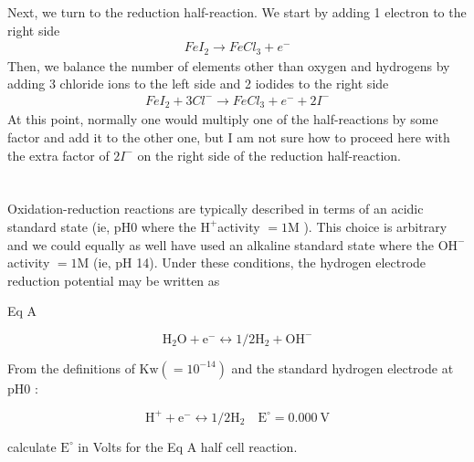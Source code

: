 \documentclass[12pt]{article}
\begin{document}
Next, we turn to the reduction half-reaction. We start by adding 1 electron to the right side
\begin{equation}
\begin{aligned}
FeI_{2} \rightarrow FeCl_{3} + e^{-}
\end{aligned}
\end{equation}
Then, we balance the number of elements other than oxygen and hydrogens by adding 3 chloride ions to the left side and 2 iodides to the right side
\begin{equation}
\begin{aligned}
FeI_{2} + 3Cl^{-} \rightarrow FeCl_{3} + e^{-} + 2I^{-}
\end{aligned}
\end{equation}
At this point, normally one would multiply one of the half-reactions by some factor and add it to the other one, but I am not sure how to proceed here with the extra factor of $2I^{-}$ on the right side of the reduction half-reaction.




\section{}
Oxidation-reduction reactions are typically described in terms of an acidic standard state (ie, $\mathrm{pH} 0$ where the $\mathrm{H}^{+}$activity $=1 \mathrm{M}$ ). This choice is arbitrary and we could equally as well have used an alkaline standard state where the $\mathrm{OH}^{-}$activity $=1 \mathrm{M}$ (ie, $\mathrm{pH}$ 14). Under these conditions, the hydrogen electrode reduction potential may be written as

Eq A

$$
\mathrm{H}_{2} \mathrm{O}+\mathrm{e}^{-} \leftrightarrow 1 / 2 \mathrm{H}_{2}+\mathrm{OH}^{-}
$$

From the definitions of $\mathrm{Kw}\left(=10^{-14}\right)$ and the standard hydrogen electrode at $\mathrm{pH} 0$ :

$$
\mathrm{H}^{+}+\mathrm{e}^{-} \leftrightarrow 1 / 2 \mathrm{H}_{2} \quad \mathrm{E}^{\circ}=0.000 \mathrm{~V}
$$

calculate $\mathrm{E}^{\circ}$ in Volts for the Eq $\mathrm{A}$ half cell reaction.
\end{document}
